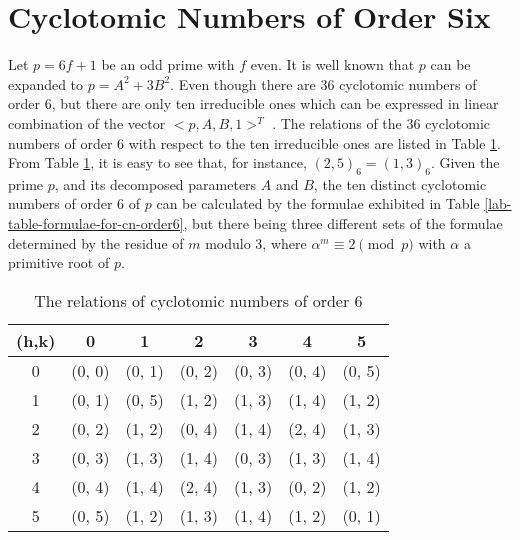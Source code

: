 \documentclass[letter]{ieice}
\begin{document}
\section{Cyclotomic Numbers of Order Six }\label{sec 2}
Let $ p=6f+1 $ be an odd prime with $ f $ even. It is well known that $ p $ can be expanded to $ p=A^{2}+3B^{2} $. Even though there are 36 cyclotomic numbers of order 6, but there are only ten irreducible ones which can be expressed in linear combination of the vector $ <p,A,B,1>^{T} $ \cite{ar01,ar02}. The relations of the 36 cyclotomic numbers of order 6 with respect to the ten irreducible ones are listed in Table \ref{lab-table-cyclotomic-number-order6}. From Table \ref{lab-table-cyclotomic-number-order6}, it is easy to see that, for instance, $ (2,5)_{6} =(1,3)_{6}$. Given the prime $ p $, and its decomposed parameters $ A $ and $ B $, the ten distinct cyclotomic numbers of order 6 of $ p $ can be calculated by the formulae exhibited in Table \ref{lab-table-formulae-for-cn-order6}, but there being three different sets of the formulae determined by the residue of $ m $ modulo 3, where $ \alpha^{m}\equiv 2 \pmod p $ with $ \alpha $ a primitive root of $ p $.
\begin{table}[tb]
\caption{The relations of cyclotomic numbers of order 6}
\label{lab-table-cyclotomic-number-order6}
{\renewcommand{\tabcolsep}{0.15cm}
\begin{center}
\begin{tabular}{|c|c|c|c|c|c|c|}
\hline
(h,k) & 0 & 1 & 2 & 3 & 4 & 5 \\
\hline
0 & (0, 0) & (0, 1) & (0, 2) & (0, 3) & (0, 4) & (0, 5) \\
\hline
1 & (0, 1) & (0, 5) & (1, 2) & (1, 3) & (1, 4) & (1, 2) \\
\hline
2 & (0, 2) & (1, 2) & (0, 4) & (1, 4) & (2, 4) & (1, 3) \\
\hline
3 & (0, 3) & (1, 3) & (1, 4) & (0, 3) & (1, 3) & (1, 4) \\
\hline
4 & (0, 4) & (1, 4) & (2, 4) & (1, 3) & (0, 2) & (1, 2) \\
\hline
5 & (0, 5) & (1, 2) & (1, 3) & (1, 4) & (1, 2) & (0, 1) \\
\hline
\end{tabular}
\end{center}
}
\end{table}
\end{document}
